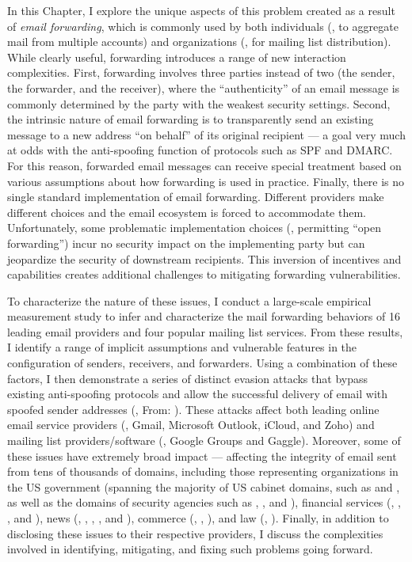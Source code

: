 In this Chapter, I explore the unique aspects of this problem created
as a result of \emph{email forwarding}, which is commonly used by both
individuals (\ie, to aggregate mail from multiple accounts) and
organizations (\ie, for mailing list distribution).  While clearly
useful, forwarding introduces a range of new interaction
complexities. First, forwarding involves three parties instead of two
(the sender, the forwarder, and the receiver), where the
``authenticity'' of an email message is commonly determined by the party with
the weakest security settings.  Second, the intrinsic nature of email
forwarding is to transparently send an existing message to a new
address ``on behalf'' of its original recipient --- a goal very much
at odds with the anti-spoofing function of protocols such as SPF and
DMARC.  For this reason, forwarded email messages can receive special
treatment based on various assumptions about how forwarding is used in
practice.  Finally, there is no single standard implementation of
email forwarding. Different providers make different choices and the
email ecosystem is forced to accommodate them.  Unfortunately, some
problematic implementation choices (\eg, permitting ``open
forwarding'') incur no security impact on the implementing party but
can jeopardize the security of downstream recipients.  This inversion of
incentives and capabilities creates additional challenges to
mitigating forwarding vulnerabilities.

To characterize the nature of these issues, I conduct a large-scale empirical
measurement study to infer and characterize the mail forwarding
behaviors of 16 leading email providers and four popular mailing
list services.  From these results, I identify a range of implicit
assumptions and vulnerable features in the
configuration of senders, receivers, and forwarders.  Using a
combination of these factors, I then demonstrate a series of distinct
evasion attacks that bypass existing anti-spoofing protocols and allow
the successful delivery of email with spoofed sender addresses (\eg,
From: ).  These attacks affect both leading
online email service providers (\eg, Gmail, Microsoft Outlook, iCloud, and
Zoho) and mailing list providers/software (\eg, Google Groups and
Gaggle).  Moreover, some of these issues have extremely broad
impact --- affecting the integrity of email sent from tens of
thousands of domains, including those representing organizations in the
US government (spanning the majority of US cabinet domains, such as
 and , as well as the domains of security agencies
such as , , and ), financial services
(\eg, , , and ), news (\eg,
,
,
, and ), commerce (\eg, , ), and law (\eg,
).
Finally, in addition to disclosing these issues to their respective
providers, I discuss the complexities involved in identifying,
mitigating, and fixing such problems going forward.

